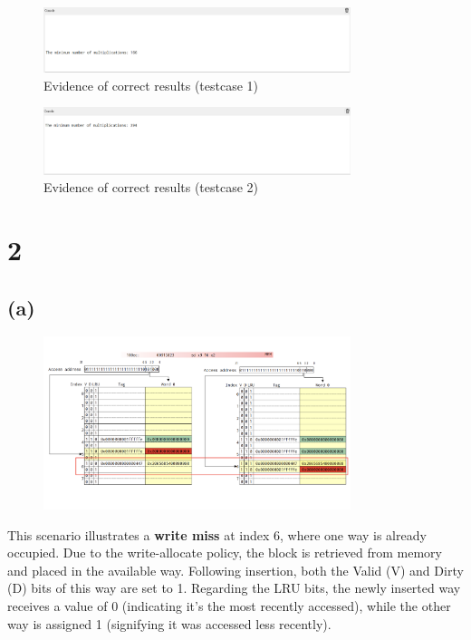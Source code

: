 \documentclass[12pt]{article}
\begin{document}
\begin{figure}[h!]
    \centering
    \includegraphics[width=0.8\textwidth]{./img/correct_1.png}
    \caption{Evidence of correct results (testcase 1)}
\end{figure}

\begin{figure}[h!]
    \centering
    \includegraphics[width=0.8\textwidth]{./img/correct_2.png}
    \caption{Evidence of correct results (testcase 2)}
\end{figure}

\clearpage

\section*{2}

\subsection*{(a)}

\begin{figure}[h!]
    \centering
    \includegraphics[width=0.8\textwidth]{./img/qa.png}
\end{figure}

This scenario illustrates a \textbf{write miss} at index 6, where one way is already occupied. Due to the write-allocate policy, the block is retrieved from memory and placed in the available way. Following insertion, both the Valid (V) and Dirty (D) bits of this way are set to 1. Regarding the LRU bits, the newly inserted way receives a value of 0 (indicating it's the most recently accessed), while the other way is assigned 1 (signifying it was accessed less recently).
\end{document}
